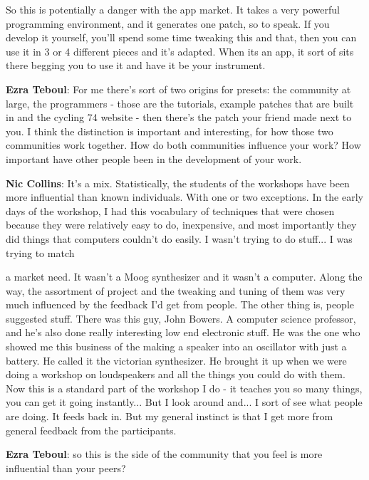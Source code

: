 So this is potentially a danger with the app market. It takes a very powerful programming environment, and it generates one patch, so to speak. If you develop it yourself, you’ll spend some time tweaking this and that, then you can use it in 3 or 4 different pieces and it’s adapted. When its an app, it sort of sits there begging you to use it and have it be your instrument.
					
\textbf{Ezra Teboul}: For me there’s sort of two origins for presets: the community at large, the programmers - those are the tutorials, example patches that are built in and the cycling 74 website - then there’s the patch your friend made next to you. I think the distinction is important and interesting, for how those two communities work together. How do both communities influence your work? How important have other people been in the development of your work.
					
\textbf{Nic Collins}: It’s a mix. Statistically, the students of the workshops have been more influential than known individuals. With one or two exceptions. In the early days of the workshop, I had this vocabulary of techniques that were chosen because they were relatively easy to do, inexpensive, and most importantly they did things that computers couldn’t do easily. I wasn’t trying to do stuff... I was trying to match
						
a market need. It wasn’t a Moog synthesizer and it wasn’t a computer. Along the way, the assortment of project and the tweaking and tuning of them was very much influenced by the feedback I’d get from people. The other thing is, people suggested stuff. There was this guy, John Bowers. A computer science professor, and he’s also done really interesting low end electronic stuff. He was the one who showed me this business of the making a speaker into an oscillator with just a battery. He called it the victorian synthesizer. He brought it up when we were doing a workshop on loudspeakers and all the things you could do with them. Now this is a standard part of the workshop I do - it teaches you so many things, you can get it going instantly... But I look around and... I sort of see what people are doing. It feeds back in. But my general instinct is that I get more from general feedback from the participants.
					
\textbf{Ezra Teboul}: so this is the side of the community that you feel is more influential than your peers?
					
